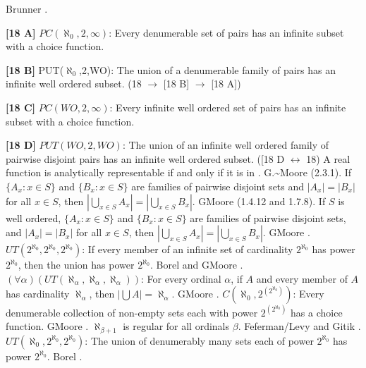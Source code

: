 \ac{Brunner} \cite{1984f}.
\smallskip
\item{}{\bf [18 A]}  $PC(\aleph_{0},2,\infty)$:  Every denumerable set
of  pairs has an infinite subset with  a choice function.
\smallskip
\item{}{\bf [18 B]} PUT($\aleph_0$,2,WO): The union of a
denumerable family of pairs has an infinite well ordered subset. (18 $\to$ [18 B] $\to$
[18 A])
\smallskip
\item{}{\bf [18 C]} $PC(WO,2,\infty)$:  Every infinite well ordered
set of  pairs has an infinite subset with a choice function.
\smallskip
\item{}{\bf [18 D]} $PUT(WO,2,WO)$: The union of an infinite well ordered
family of pairwise disjoint pairs has an infinite well ordered subset.
([18 D $\leftrightarrow$ 18)
\medskip
{} A real function is analytically representable if
and only if it is in . \ac{G.~Moore}
\cite{1982} (2.3.1).
\medskip
{} If $\{A_{x}: x \in S \}$ and $\{B_{x}:
x \in  S\}$ are families  of pairwise disjoint sets and $ |A_{x}|
= |B_{x}|$ for all $x\in S$, then $|\bigcup_{x\in S}A_{x}| =
|\bigcup_{x\in S} B_{x}|$. G\. \ac{Moore} \cite{1982} (1.4.12 and 1.7.8).
\medskip
{} If $S$ is well ordered, $\{A_{x}: x\in S\}$ and
$\{B_{x}: x\in S\}$ are families of pairwise disjoint sets, and
$|A_{x}| = |B_{x}|$ for all $x\in S$, then $|\bigcup_{x\in S}A_{x}|=
|\bigcup_{x\in S} B_{x}|$. G\. \ac{Moore} \cite{1982}.
\medskip
{} $UT(2^{\aleph_{0}},2^{\aleph_{0}},2^{\aleph_{0}})$:
If every member of an infinite  set of cardinality $2^{\aleph _{0}}$ has
power $2^{\aleph_{0}}$, then the union has power $2^{\aleph_{0}}$.
\ac{Borel} \cite{1898} and G\. \ac{Moore} \cite{1982}.
\medskip
{} $(\forall \alpha)(UT(\aleph_{\alpha},\aleph_{\alpha},
\aleph_{\alpha}))$: For every ordinal $\alpha$, if $A$ and every member
of $A$ has cardinality $\aleph_{\alpha}$, then $|\bigcup A| =
\aleph _{\alpha }$.  G\. \ac{Moore} \cite{1982}.
\medskip
{} $C(\aleph_0,2^{(2^{\aleph_0})})$: Every denumerable
collection of non-empty sets each with power $2^{(2^{\aleph_{0}})}$
has a choice function. G\. \ac{Moore} \cite{1982}.
\medskip
{} $\aleph _{\beta +1}$ is regular for all ordinals
$\beta$.  \ac{Feferman/Levy} \cite{1963} and \ac{Gitik} \cite{1980}.
\medskip
{} $UT(\aleph_{0},2^{\aleph_{0}},2^{\aleph_{0}})$: The
union of denumerably many sets each of power $2^{\aleph _{0}}$ has power
$2^{\aleph_{0}}$.  \ac{Borel} \cite{1898}.
